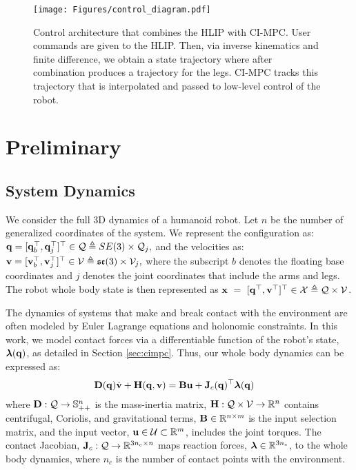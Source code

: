 \begin{figure*}[t]
    \vspace{10pt} 
    \centering
    \texttt{[image: Figures/control\_diagram.pdf]}
    \caption{Control architecture that combines the HLIP with CI-MPC. User commands are given to the HLIP. Then, via inverse kinematics and finite difference, we obtain a state trajectory where after combination produces a trajectory for the legs. CI-MPC tracks this trajectory that is interpolated and passed to low-level control of the robot.}
    \label{fig:control_architecture}
    \vspace{-20pt} 
\end{figure*}

\section{Preliminary}\label{sec:preliminary}
\subsection{System Dynamics}
We consider the full 3D dynamics of a humanoid robot. Let $n$ be the number of generalized coordinates of the system. We represent the configuration as:
%
$
    \mathbf{q} = 
    [
    \mathbf{q}_b^\top , \mathbf{q}_j^\top
    ]^\top
    \in  \mathcal{Q}
    \triangleq  SE(3) \times \mathcal{Q}_j,
$
%
and the velocities as:
$
    \mathbf{v} = 
    [
    \mathbf{v}_b^\top , \mathbf{v}_j^\top
    ]^\top
    \in  \mathcal{V} 
    \triangleq \mathfrak{se}(3) \times \mathcal{V}_j,
$
%
where the subscript $b$ denotes the floating base coordinates and $j$ denotes the joint coordinates that include the arms and legs.
%
The robot whole body state is then represented as $\mathbf{x}~=~[\mathbf{q}^\top, \mathbf{v}^\top]^{\top} \in \mathcal{X} \triangleq \mathcal{Q} \times \mathcal{V}$.

The dynamics of systems that make and break contact with the environment are often modeled by Euler Lagrange equations and holonomic constraints. In this work, we model contact forces via a differentiable function of the robot's state, $\boldsymbol{\lambda}(\mathbf{q})$, as detailed in Section \ref{sec:cimpc}. Thus, our whole body dynamics can be expressed as:
%
\begin{align} 
    \mathbf{D}(\mathbf{q}) \dot{\mathbf{v}} + \mathbf{H}(\mathbf{q}, \mathbf{v}) &= \mathbf{B} \mathbf{u} + \mathbf{J}_c(\mathbf{q})^\top \boldsymbol{\lambda} (\mathbf{q})\label{eq:euler-lagrange} 
\end{align}
% 
where $\mathbf{D}: \mathcal{Q} \rightarrow \mathbb{S}_{++}^n$ is the mass-inertia matrix, $\mathbf{H} : \mathcal{Q} \times \mathcal{V} \rightarrow \mathbb{R}^n$ contains centrifugal, Coriolis, and gravitational terms, $\mathbf{B} \in \mathbb{R}^{n \times m}$ is the input selection matrix, and the input vector, $\mathbf{u} \in \mathcal{U} \subset \mathbb{R}^m$, includes the joint torques. The contact Jacobian, $\mathbf{J}_c: \mathcal{Q} \rightarrow \mathbb{R}^{3 n_c\times n}$ maps reaction forces, $\boldsymbol{\lambda} \in \mathbb{R}^{3 n_c}$, to the whole body dynamics, where $n_c$ is the number of contact points with the environment.

